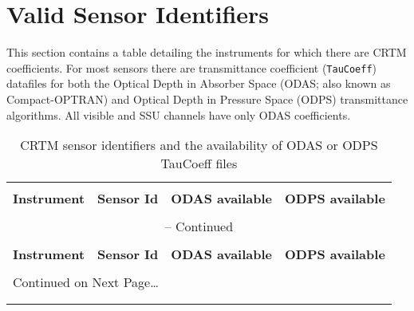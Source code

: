 \chapter{Valid Sensor Identifiers}
\label{sec:sensor_id}

This section contains a table detailing the instruments for which there are CRTM coefficients. For most sensors there are transmittance coefficient (\texttt{TauCoeff}) datafiles for both the Optical Depth in Absorber Space (ODAS; also known as Compact-OPTRAN) and Optical Depth in Pressure Space (ODPS) transmittance algorithms. All visible and SSU channels have only ODAS coefficients.

\clearpage
\begin{center}
\begin{longtable}{c c c c}
  \caption[CRTM sensor identifiers and the availability of ODAS or ODPS TauCoeff files]{CRTM sensor identifiers and the availability of ODAS or ODPS TauCoeff files}
  \label{tab:sensor_id} \\

  \hline\hline \\[-2ex]
    \multicolumn{1}{c}{\sffamily\textbf{Instrument}} &
    \multicolumn{1}{c}{\sffamily\textbf{Sensor Id}} &
    \multicolumn{1}{c}{\sffamily\textbf{ODAS available}} &
    \multicolumn{1}{c}{\sffamily\textbf{ODPS available}} \\[0.5ex] \hline
    \\[-1.8ex]
  \endfirsthead

  \multicolumn{4}{c}{\sffamily\textbf{{\tablename} \thetable{}} -- Continued} \\[0.5ex]
  \hline\hline \\[-2ex]
      \multicolumn{1}{c}{\sffamily\textbf{Instrument}} &
      \multicolumn{1}{c}{\sffamily\textbf{Sensor Id}} &
      \multicolumn{1}{c}{\sffamily\textbf{ODAS available}} &
      \multicolumn{1}{c}{\sffamily\textbf{ODPS available}} \\[0.5ex] \hline
      \\[-1.8ex]
  \endhead
  
  \hline\hline 
    \multicolumn{4}{l}{{Continued on Next Page\ldots}} \\
  \endfoot
  
  \\[-1.8ex] \hline \hline
  \endlastfoot
  

\end{longtable}
\end{center}
